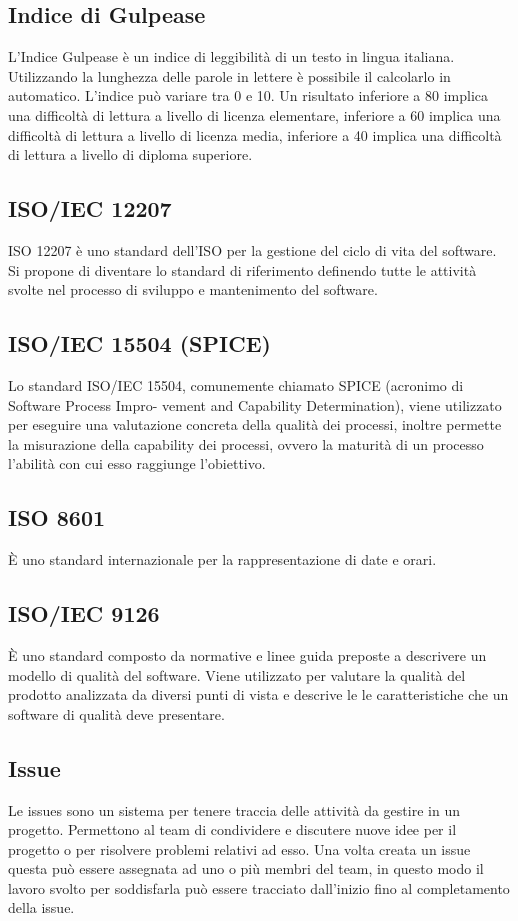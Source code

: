 \documentclass[11pt,a4paper]{article}
\begin{document}
	\subsection{Indice di Gulpease}
	L'Indice Gulpease è un indice di leggibilità di un testo in lingua italiana. Utilizzando la lunghezza delle parole in lettere è possibile il calcolarlo in automatico.
	L'indice può variare tra 0 e 10. Un risultato inferiore a 80 implica una difficoltà di lettura a livello di licenza elementare, inferiore a 60 implica una difficoltà di lettura a livello di licenza media, inferiore a 40 implica una difficoltà di lettura a livello di diploma superiore.
		\subsection{ISO/IEC 12207}
		ISO 12207 è uno standard dell'ISO per la gestione del ciclo di vita del software. Si propone di diventare lo standard di riferimento definendo tutte le attività svolte nel processo di sviluppo e mantenimento del software.
	\subsection{ISO/IEC 15504 (SPICE)}
	Lo standard ISO/IEC 15504, comunemente chiamato SPICE (acronimo di Software Process Impro-
vement and Capability Determination), viene utilizzato per eseguire una valutazione concreta della
qualità dei processi, inoltre permette la misurazione della capability dei processi, ovvero la maturità
di un processo l’abilità con cui esso raggiunge l’obiettivo.

	\subsection{ISO 8601}
	È uno standard internazionale per la rappresentazione di date e orari.
	\subsection{ISO/IEC 9126}
	È uno standard composto da normative e linee guida preposte a descrivere un modello di qualità del software.
	Viene utilizzato per valutare la qualità del prodotto analizzata da diversi punti di  vista e descrive le le caratteristiche che un software di qualità deve presentare.
	\subsection{Issue}
	Le issues sono un sistema per tenere traccia delle attività da gestire in un progetto. Permettono al team di condividere e discutere nuove idee per il progetto o per risolvere problemi relativi ad esso. Una volta creata un issue questa può essere assegnata ad uno o più membri del team, in questo modo il lavoro svolto per soddisfarla può essere tracciato dall'inizio fino al completamento della issue.
\end{document}
